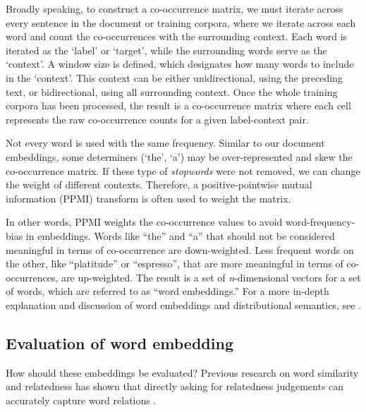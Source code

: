 Broadly speaking, to construct a co-occurrence matrix, we must iterate across every sentence in the document or training corpora, where we iterate across each word and count the co-occurrences with the surrounding context. Each word is iterated as the `label' or `target', while the surrounding words serve as the `context'. A window size is defined, which designates how many words to include in the `context'. This context can be either unidirectional, using the preceding text, or bidirectional, using all surrounding context. Once the whole training corpora has been processed, the result is a co-occurrence matrix where each cell represents the raw co-occurrence counts for a given label-context pair.


Not every word is used with the same frequency. Similar to our document embeddings, some determiners (`the', `a') may be over-represented and skew the co-occurrence matrix. If these type of \emph{stopwords} were not removed, we can change the weight of different contexts. Therefore, a positive-pointwise mutual information (PPMI) transform is often used to weight the matrix. 

In other words, PPMI weights the co-occurrence values to avoid word-frequency-bias in embeddings. Words like ``the'' and ``a'' that should not be considered meaningful in terms of co-occurrence are down-weighted. Less frequent words on the other, like ``platitude'' or ``espresso'', that are more meaningful in terms of co-occurrences, are up-weighted. The result is a set of \textit{n}-dimensional vectors for a set of words, which are referred to as ``word embeddings.'' For a more in-depth explanation and discussion of word embeddings and distributional semantics, see \cite{lenci2018distributional}.


\subsection{Evaluation of word embedding}

How should these embeddings be evaluated? Previous research on word similarity and relatedness has shown that directly asking for relatedness judgements can accurately capture word relations \cite{finkelstein2001placing}.

